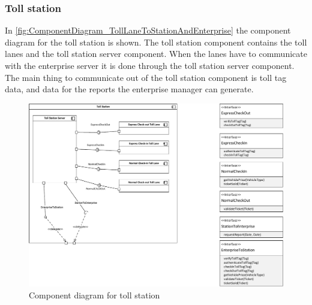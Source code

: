 \subsubsection*{Toll station}
In \autoref{fig:ComponentDiagram_TollLaneToStationAndEnterprise} the component diagram for the toll station is shown. The toll station component contains the toll lanes and the toll station server component. When the lanes have to communicate with the enterprise server it is done through the toll station server component. The main thing to communicate out of the toll station component is toll tag data, and data for the reports the enterprise manager can generate.
\begin{figure}[H]
\centering
\includegraphics[width=1\textwidth]{img/component_diagrams/componentdiagram_tolllanetostationandenterprise}
\caption{Component diagram for toll station}
\label{fig:ComponentDiagram_TollLaneToStationAndEnterprise}
\end{figure}

